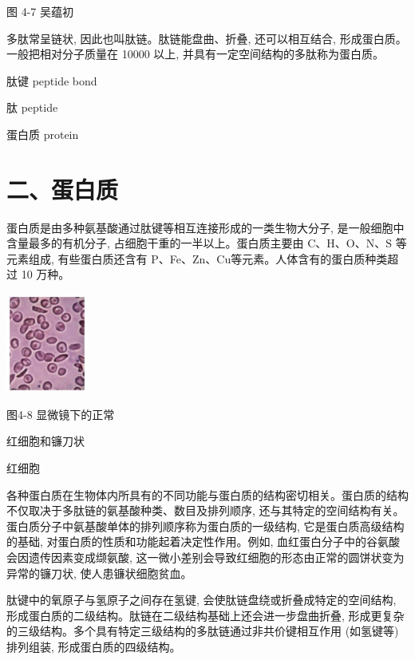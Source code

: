 \documentclass[10pt]{article}
\begin{document}
图 4-7 吴蕴初

多肽常呈链状, 因此也叫肽链。肽链能盘曲、折叠, 还可以相互结合, 形成蛋白质。一般把相对分子质量在 10000 以上, 并具有一定空间结构的多肽称为蛋白质。

\begin{mdframed}

肽键 peptide bond

肽 peptide

蛋白质 protein

\end{mdframed}

\section*{二、蛋白质}

蛋白质是由多种氨基酸通过肽键等相互连接形成的一类生物大分子, 是一般细胞中含量最多的有机分子, 占细胞干重的一半以上。蛋白质主要由 \(\mathrm{C}\text{、}\mathrm{H}\text{、}\mathrm{O}\text{、}\mathrm{N}\text{、}\mathrm{S}\) 等元素组成, 有些蛋白质还含有 P、Fe、Zn、Cu等元素。人体含有的蛋白质种类超过 10 万种。

\begin{mdframed}

\begin{center}
\includegraphics[max width=0.2\textwidth]{images/0190efc5-b58a-7c43-bfb0-e0a030df9cfd_119_672074.jpg}
\end{center}

图4-8 显微镜下的正常

红细胞和镰刀状

红细胞

\end{mdframed}

各种蛋白质在生物体内所具有的不同功能与蛋白质的结构密切相关。蛋白质的结构不仅取决于多肽链的氨基酸种类、数目及排列顺序, 还与其特定的空间结构有关。蛋白质分子中氨基酸单体的排列顺序称为蛋白质的一级结构, 它是蛋白质高级结构的基础, 对蛋白质的性质和功能起着决定性作用。例如, 血红蛋白分子中的谷氨酸会因遗传因素变成缬氨酸, 这一微小差别会导致红细胞的形态由正常的圆饼状变为异常的镰刀状, 使人患镰状细胞贫血。

肽键中的氧原子与氢原子之间存在氢键, 会使肽链盘绕或折叠成特定的空间结构, 形成蛋白质的二级结构。肽链在二级结构基础上还会进一步盘曲折叠, 形成更复杂的三级结构。多个具有特定三级结构的多肽链通过非共价键相互作用 (如氢键等) 排列组装, 形成蛋白质的四级结构。
\end{document}
